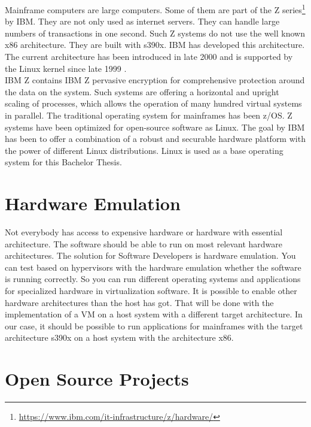 Mainframe computers are large computers. Some of them are part of the Z series\footnote{\url{https://www.ibm.com/it-infrastructure/z/hardware/}} by IBM. They are not only used as internet servers. They can handle large numbers of transactions in one second\cite[~p.56]{Tanenbaum2014}. Such Z systems do not use the well known x86 architecture. They are built with s390x. IBM has developed this architecture. The current architecture has been introduced in late 2000 and is supported by the \gls{Linux kernel} since late 1999 \cite[~p.15]{Block2019}. \\
IBM Z contains IBM Z pervasive encryption for comprehensive protection around the data on the system\cite[~p.4]{Lascu2020}. Such systems are offering a horizontal and upright \gls{scaling} of processes, which allows the operation of many hundred virtual systems in parallel\cite[~p.13]{Tschoeke2009}. The traditional operating system for mainframes has been z/OS. 
Z systems have been optimized for open-source software as Linux\cite[~p.8]{Lascu2020}. The goal by IBM has been to offer a combination of a robust and securable hardware platform with the power of different Linux distributions. 
Linux is used as a base operating system for this Bachelor Thesis.


\section{Hardware Emulation}

Not everybody has access to expensive hardware or hardware with essential architecture. The software should be able to run on most relevant hardware architectures. The solution for Software Developers is hardware emulation. 
You can test based on hypervisors with the hardware emulation whether the software is running correctly. 
So you can run different operating systems and applications for specialized hardware in virtualization software. 
It is possible to enable other hardware architectures than the host has got. 
That will be done with the implementation of a \gls{VM} on a host system with a different target architecture\cite[~p.3]{Rosenthal2015}. In our case, it should be possible to run applications for mainframes with the target
architecture s390x on a host system with the architecture x86.


\section{Open Source Projects}

